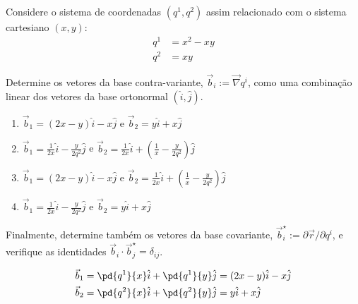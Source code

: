 \begin{question}
    Considere o sistema de coordenadas $(q^1, q^2)$ assim relacionado com o sistema cartesiano $(x,y)$:
    \begin{align*}
      q^1 &= x^2 - xy \\
      q^2 &= xy
    \end{align*}

    Determine os vetores da base contra-variante, $\vec b_i := \vec\nabla q^i$, como uma combinação linear dos vetores da base ortonormal $(\hat i, \hat j)$.
    \begin{enumerate}
      \item $\vec b_1 = (2x - y)\hat i - x\hat j$ e $\vec b_2 = y\hat i + x\hat j$ \rightanswer
      \item $\vec b_1 = \frac{1}{2x}\hat i - \frac{y}{2q^2}\hat j$ e $\vec b_2 = \frac{1}{2x}\hat i + \left(\frac{1}{x} - \frac{y}{2q^2}\right)\hat j$
      \item $\vec b_1 = (2x - y)\hat i - x\hat j$ e $\vec b_2 = \frac{1}{2x}\hat i + \left(\frac{1}{x} - \frac{y}{2q^2}\right)\hat j$
      \item $\vec b_1 = \frac{1}{2x}\hat i - \frac{y}{2q^2}\hat j$ e $\vec b_2 = y\hat i + x\hat j$
    \end{enumerate}

    Finalmente, determine também os vetores da base covariante, $\vec b_i^{\star} := \partial\vec r/\partial q^i$, e verifique as identidades $\vec b_i \cdot \vec b_j^{\star} = \delta_{ij}$.

    \begin{solution}
      \begin{align*}
        \vec b_1 = \pd{q^1}{x}\hat i + \pd{q^1}{y}\hat j &= (2x - y)\hat i - x\hat j \\
        \vec b_2 = \pd{q^2}{x}\hat i + \pd{q^2}{y}\hat j &=  y \hat i + x \hat j
      \end{align*}
    \end{solution}
\end{question}